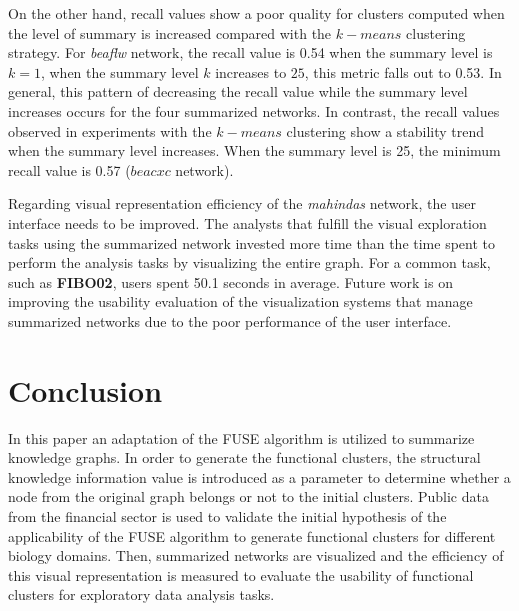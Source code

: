 \documentclass{ieeeaccess}
\begin{document}
On the other hand, recall values show a poor quality for clusters computed when the
level of summary is increased compared with the $k-means$ clustering strategy. For \textit{beaflw} 
network, the recall value is 0.54 when the summary level is $k = 1$, when the summary level $k$
increases to $25$, this metric falls out to 0.53. In general, this pattern of
decreasing the recall value while the summary level increases occurs for 
the four summarized networks. In contrast, the recall values observed in
experiments with the $k-means$ clustering show a stability trend when the summary level increases. When
the summary level is 25, the minimum recall value is 0.57 ($beacxc$ network).

Regarding visual representation efficiency of the \textit{mahindas} network, the
user interface needs to be improved. The analysts that fulfill the visual 
exploration tasks using the summarized network invested more time than the 
time spent to perform the analysis tasks by visualizing the entire graph. For
a common task, such as \textbf{FIBO02}, users spent 50.1 seconds in average.
Future work is on improving the usability evaluation of the 
visualization systems that manage summarized networks due to the poor performance of the user interface.

\section{Conclusion}

In this paper an adaptation of the FUSE algorithm is utilized to summarize knowledge graphs. In order to generate the functional clusters, the structural knowledge information value is introduced as a parameter to determine whether a node from the original graph belongs or not to the initial clusters. Public data from the financial sector is used to validate the initial hypothesis of the applicability of the FUSE algorithm to generate functional clusters for different biology domains.  Then,  summarized networks are visualized and the efficiency of this visual representation is measured to evaluate the usability of functional clusters for exploratory data analysis tasks.


 

\EOD
\end{document}
